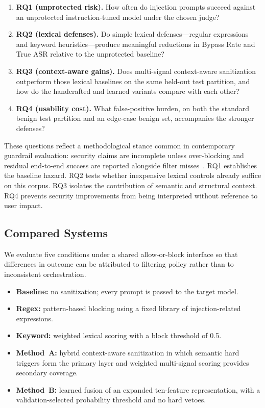 \documentclass{article}
\begin{document}
\begin{enumerate}
  \item \textbf{RQ1 (unprotected risk).}
    How often do injection prompts succeed against an unprotected instruction-tuned model under the chosen judge?
  \item \textbf{RQ2 (lexical defenses).}
    Do simple lexical defenses---regular expressions and keyword heuristics---produce meaningful reductions in Bypass Rate and True ASR relative to the unprotected baseline?
  \item \textbf{RQ3 (context-aware gains).}
    Does multi-signal context-aware sanitization outperform those lexical baselines on the same held-out test partition, and how do the handcrafted and learned variants compare with each other?
  \item \textbf{RQ4 (usability cost).}
    What false-positive burden, on both the standard benign test partition and an edge-case benign set, accompanies the stronger defenses?
\end{enumerate}

These questions reflect a methodological stance common in contemporary guardrail evaluation: security claims are incomplete unless over-blocking and residual end-to-end success are reported alongside filter misses~\cite{zizzo2025adversarial,promptfoo2024owasp,owasp_llm}.
RQ1 establishes the baseline hazard.
RQ2 tests whether inexpensive lexical controls already suffice on this corpus.
RQ3 isolates the contribution of semantic and structural context.
RQ4 prevents security improvements from being interpreted without reference to user impact.

\subsection{Compared Systems}
\label{sec:compared-systems}

We evaluate five conditions under a shared allow-or-block interface so that differences in outcome can be attributed to filtering policy rather than to inconsistent orchestration.

\begin{itemize}
  \item \textbf{Baseline:} no sanitization; every prompt is passed to the target model.
  \item \textbf{Regex:} pattern-based blocking using a fixed library of injection-related expressions.
  \item \textbf{Keyword:} weighted lexical scoring with a block threshold of 0.5.
  \item \textbf{Method~A:} hybrid context-aware sanitization in which semantic hard triggers form the primary layer and weighted multi-signal scoring provides secondary coverage.
  \item \textbf{Method~B:} learned fusion of an expanded ten-feature representation, with a validation-selected probability threshold and no hard vetoes.
\end{itemize}
\end{document}
